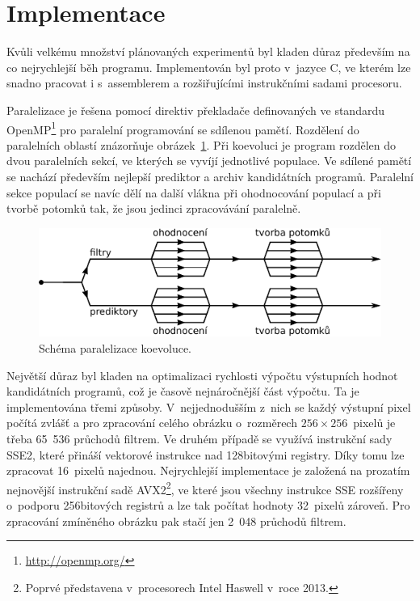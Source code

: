 \documentclass[czech]{ExcelAtFIT} %
\begin{document}
\section{Implementace}
\label{sec:Implementation}

Kvůli velkému množství plánovaných experimentů byl kladen důraz především na co nejrychlejší běh programu. Implementován byl proto v~jazyce C, ve kterém lze snadno pracovat i s~assemblerem a rozšiřujícími instrukčními sadami procesoru.

Paralelizace je řešena pomocí direktiv překladače definovaných ve standardu OpenMP\footnote{\url{http://openmp.org/}} pro paralelní programování se sdílenou pamětí. Rozdělení do paralelních oblastí znázorňuje obrázek~\ref{fig:ParallelSections}. Při koevoluci je program rozdělen do dvou paralelních sekcí, ve kterých se vyvíjí jednotlivé populace. Ve sdílené pamětí se nachází především nejlepší prediktor a archiv kandidátních programů. Paralelní sekce populací se navíc dělí na další vlákna při ohodnocování populací a při tvorbě potomků tak, že jsou jedinci zpracovávání paralelně.

\begin{figure}[htb]
    \centering
    \includegraphics[width=0.95\linewidth]{images/openmp.pdf}
    \caption{Schéma paralelizace koevoluce.}
    \label{fig:ParallelSections}
\end{figure}

Největší důraz byl kladen na optimalizaci rychlosti výpočtu výstupních hodnot kandidátních programů, což je časově nejnáročnější část výpočtu. Ta je imple\-men\-to\-vána třemi způsoby. V~nejjednodušším z~nich se každý výstupní pixel počítá zvlášť a pro zpra\-co\-vání celého obrázku o~rozměrech $256\times256$~pixelů je třeba 65~536 průchodů filtrem. Ve druhém případě se využívá instrukční sady SSE2, které přináší vek\-to\-rové instrukce nad 128bitovými registry. Díky tomu lze zpracovat 16~pixelů najednou. Nejrychlejší im\-ple\-men\-tace je založená na prozatím nejnovější instrukční sadě AVX2\footnote{Poprvé představena v~procesorech Intel Haswell v~roce 2013.}, ve které jsou všechny instrukce SSE rozšířeny o~podporu 256bitových registrů a lze tak počítat hodnoty 32~pixelů zároveň. Pro zpracování zmíněného obrázku pak stačí jen 2~048 průchodů filtrem.
\end{document}
